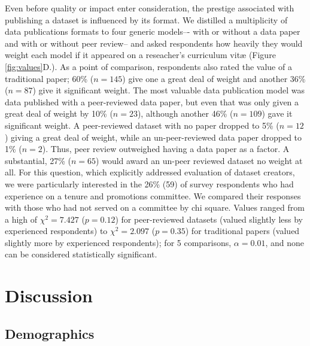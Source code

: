 \documentclass[10pt]{article}
\begin{document}
Even before quality or impact enter consideration, the prestige associated with publishing a dataset is influenced by its format.
We distilled a multiplicity of data publications formats to four generic models–- with or without a data paper and with or without peer review-- and asked respondents how heavily they would weight each model if it appeared on a reseacher's curriculum vit{\ae} (Figure \ref{fig:values}D.).
As a point of comparison, respondents also rated the value of a traditional paper; 60\% ($n=145$) give one a great deal of weight and another 36\% ($n=87$) give it significant weight.
The most valuable data publication model was data published with a peer-reviewed data paper, but even that was only given a great deal of weight by 10\% ($n=23$), although another 46\% ($n=109$) gave it significant weight.
A peer-reviewed dataset with no paper dropped to 5\% ($n=12$) giving a great deal of weight, while an un-peer-reviewed data paper dropped to 1\% ($n=2$).
Thus, peer review outweighed having a data paper as a factor. 
A substantial, 27\% ($n=65$) would award an un-peer reviewed dataset no weight at all.
For this question, which explicitly addressed evaluation of dataset creators, we were particularly interested in the 26\% (59) of survey respondents who had experience on a tenure and promotions committee.
We compared their responses with those who had not served on a committee by chi square.
Values ranged from a high of $\chi^{2}= 7.427$ ($p= 0.12$) for peer-reviewed datasets (valued slightly less by experienced respondents) to $\chi^{2}= 2.097$ ($p= 0.35$) for traditional papers (valued slightly more by experienced respondents); for 5 comparisons, $\alpha=0.01$, and none can be considered statistically significant.

\section*{Discussion}

\subsection*{Demographics}
\end{document}
